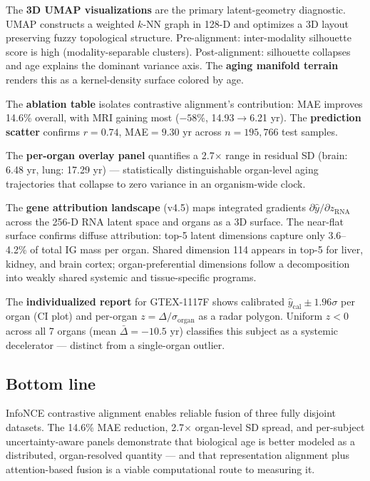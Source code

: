 \documentclass[11pt]{article}
\begin{document}
\begin{tcolorbox}[L3box]
The \textbf{3D UMAP visualizations} are the primary latent-geometry diagnostic. UMAP constructs a weighted $k$-NN graph in 128-D and optimizes a 3D layout preserving fuzzy topological structure. Pre-alignment: inter-modality silhouette score is high (modality-separable clusters). Post-alignment: silhouette collapses and age explains the dominant variance axis. The \textbf{aging manifold terrain} renders this as a kernel-density surface colored by age.

The \textbf{ablation table} isolates contrastive alignment's contribution: MAE improves 14.6\% overall, with MRI gaining most ($-58\%$, 14.93$\to$6.21 yr). The \textbf{prediction scatter} confirms $r=0.74$, MAE$=9.30$ yr across $n=195{,}766$ test samples.

The \textbf{per-organ overlay panel} quantifies a 2.7$\times$ range in residual SD (brain: 6.48 yr, lung: 17.29 yr) --- statistically distinguishable organ-level aging trajectories that collapse to zero variance in an organism-wide clock.

The \textbf{gene attribution landscape} (v4.5) maps integrated gradients $\partial\hat{y}/\partial z_\text{RNA}$ across the 256-D RNA latent space and organs as a 3D surface. The near-flat surface confirms diffuse attribution: top-5 latent dimensions capture only 3.6--4.2\% of total IG mass per organ. Shared dimension 114 appears in top-5 for liver, kidney, and brain cortex; organ-preferential dimensions follow a decomposition into weakly shared systemic and tissue-specific programs.

The \textbf{individualized report} for GTEX-1117F shows calibrated $\hat{y}_\text{cal} \pm 1.96\sigma$ per organ (CI plot) and per-organ $z=\Delta/\sigma_\text{organ}$ as a radar polygon. Uniform $z<0$ across all 7 organs (mean $\bar{\Delta}=-10.5$ yr) classifies this subject as a systemic decelerator --- distinct from a single-organ outlier.

\subsection{Bottom line}

InfoNCE contrastive alignment enables reliable fusion of three fully disjoint datasets. The 14.6\% MAE reduction, 2.7$\times$ organ-level SD spread, and per-subject uncertainty-aware panels demonstrate that biological age is better modeled as a distributed, organ-resolved quantity --- and that representation alignment plus attention-based fusion is a viable computational route to measuring it.

\end{tcolorbox}
\end{document}
